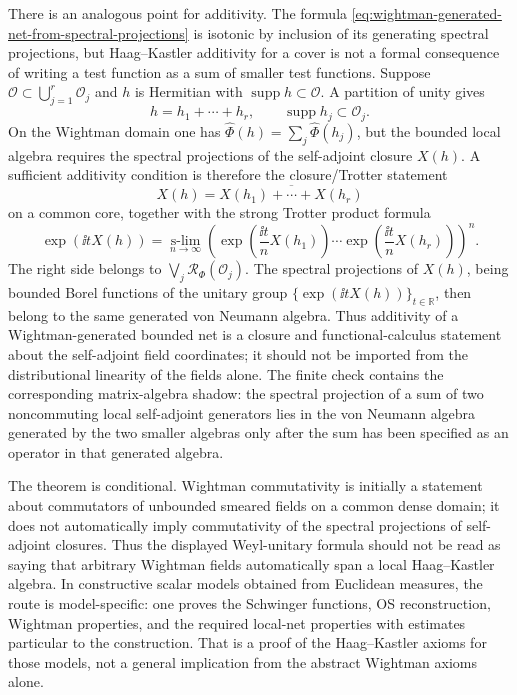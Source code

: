There is an analogous point for additivity.  The formula
\eqref{eq:wightman-generated-net-from-spectral-projections} is isotonic by
inclusion of its generating spectral projections, but Haag--Kastler additivity
for a cover is not a formal consequence of writing a test function as a sum of
smaller test functions.  Suppose
\(\mathcal O\subset\bigcup_{j=1}^r\mathcal O_j\) and \(h\) is Hermitian with
\(\operatorname{supp}h\subset\mathcal O\).  A partition of unity gives
\[
  h=h_1+\cdots+h_r,\qquad
  \operatorname{supp}h_j\subset\mathcal O_j .
\]
On the Wightman domain one has
\(\widehat\Phi(h)=\sum_j\widehat\Phi(h_j)\), but the bounded local algebra
requires the spectral projections of the self-adjoint closure \(X(h)\).  A
sufficient additivity condition is therefore the closure/Trotter statement
\[
  X(h)=\overline{X(h_1)+\cdots+X(h_r)}
\]
on a common core, together with the strong Trotter product formula
\begin{equation}
  \exp(\ii tX(h))
  =
  \operatorname*{s-lim}_{n\to\infty}
  \left(
    \exp\!\left(\frac{\ii t}{n}X(h_1)\right)
    \cdots
    \exp\!\left(\frac{\ii t}{n}X(h_r)\right)
  \right)^n .
  \label{eq:wightman-net-trotter-additivity-bridge}
\end{equation}
The right side belongs to
\(\bigvee_j\mathcal R_\Phi(\mathcal O_j)\).  The spectral projections of
\(X(h)\), being bounded Borel functions of the unitary group
\(\{\exp(\ii tX(h))\}_{t\in\mathbb R}\), then belong to the same generated
von Neumann algebra.  Thus additivity of a Wightman-generated bounded net is
a closure and functional-calculus statement about the self-adjoint field
coordinates; it should not be imported from the distributional linearity of
the fields alone.  The finite check
 contains the
corresponding matrix-algebra shadow: the spectral projection of a sum of two
noncommuting local self-adjoint generators lies in the von Neumann algebra
generated by the two smaller algebras only after the sum has been specified as
an operator in that generated algebra.

\begin{remark}
The theorem is conditional.  Wightman commutativity is initially a statement
about commutators of unbounded smeared fields on a common dense domain; it
does not automatically imply commutativity of the spectral projections of
self-adjoint closures.  Thus the displayed Weyl-unitary formula should not be
read as saying that arbitrary Wightman fields automatically span a local
Haag--Kastler algebra.  In constructive scalar models obtained from Euclidean
measures, the route is model-specific: one proves the Schwinger functions,
OS reconstruction, Wightman properties, and the required local-net properties
with estimates particular to the construction.  That is a proof of the
Haag--Kastler axioms for those models, not a general implication from the
abstract Wightman axioms alone.
\end{remark}

